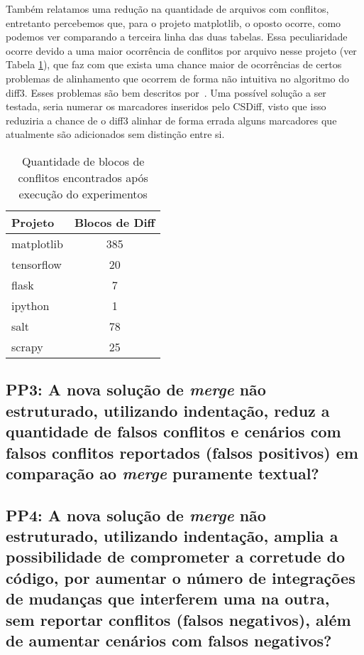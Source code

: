 Também relatamos uma redução na quantidade de arquivos com conflitos, entretanto percebemos que,
para o projeto matplotlib, o oposto ocorre, como podemos ver comparando a terceira linha das duas tabelas. Essa peculiaridade
ocorre devido a uma maior ocorrência de conflitos por arquivo nesse projeto (ver Tabela \ref{block_diff}), que faz com que
exista uma chance maior de ocorrências de certos problemas de alinhamento que ocorrem de forma não intuitiva no algoritmo do
diff3. Esses problemas são bem descritos por~\cite{khan07}. Uma possível solução a ser testada, seria numerar os marcadores
inseridos pelo CSDiff, visto que isso reduziria a chance de o diff3 alinhar de forma errada alguns marcadores que atualmente
são adicionados sem distinção entre si.

\begin{table}[ht]
	\begin{center}
		\begin{tabular}{|l|c|}
			\hline
			\textbf{Projeto} & \textbf{Blocos de Diff} \\
			\hline
			matplotlib       & 385                     \\
			tensorflow       & 20                      \\
			flask            & 7                       \\
			ipython          & 1                       \\
			salt             & 78                      \\
			scrapy           & 25                      \\
			\hline
		\end{tabular}
	\end{center}
	\caption{Quantidade de blocos de conflitos encontrados após execução do experimentos}\label{block_diff}
\end{table}

\subsection{PP3: A nova solução de \emph{merge} não estruturado, utilizando indentação,
	reduz a quantidade de falsos conflitos e cenários com falsos conflitos reportados
	(falsos positivos) em comparação ao \emph{merge} puramente textual?}

\subsection{PP4: A nova solução de \emph{merge} não estruturado, utilizando indentação,
	amplia a possibilidade de comprometer a corretude do código, por aumentar o número de
	integrações de mudanças que interferem uma na outra, sem reportar conflitos (falsos negativos),
	além de aumentar cenários com falsos negativos?}

